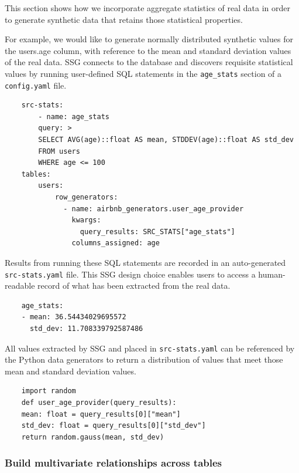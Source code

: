 \documentclass[11pt]{article}
\begin{document}
This section shows how we incorporate aggregate statistics of real data in order to generate synthetic data that retains those statistical properties.

For example, we would like to generate normally distributed synthetic values for the users.age column, with reference to the mean and standard deviation values of the real data. SSG connects to the database and discovers requisite statistical values by running user-defined SQL statements in the \texttt{age\_stats} section of a \texttt{config.yaml} file.

\begin{verbatim}
    src-stats:
        - name: age_stats
        query: >
        SELECT AVG(age)::float AS mean, STDDEV(age)::float AS std_dev
        FROM users
        WHERE age <= 100
    tables:
        users:
            row_generators:
              - name: airbnb_generators.user_age_provider
                kwargs:
                  query_results: SRC_STATS["age_stats"]
                columns_assigned: age
\end{verbatim}

Results from running these SQL statements are recorded in an auto-generated \texttt{src-stats.yaml} file. This SSG design choice enables users to access a human-readable record of what has been extracted from the real data.

\begin{verbatim}
    age_stats:
    - mean: 36.54434029695572
      std_dev: 11.708339792587486
\end{verbatim}

All values extracted by SSG and placed in \texttt{src-stats.yaml} can be referenced by the Python data generators to return a distribution of values that meet those mean and standard deviation values.

\begin{verbatim}
    import random
    def user_age_provider(query_results):
    mean: float = query_results[0]["mean"]
    std_dev: float = query_results[0]["std_dev"]
    return random.gauss(mean, std_dev)
\end{verbatim}

\subsubsection{Build multivariate relationships across tables}
\end{document}
